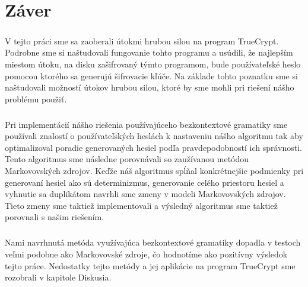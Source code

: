 \chapter{Záver}

\paragraph{}
V tejto práci sme sa zaoberali útokmi hrubou silou na program TrueCrypt. Podrobne sme si naštudovali fungovanie tohto programu a usúdili, že najlepším miestom útoku, na disku zašifrovaný týmto programom, bude používateľské heslo pomocou ktorého sa generujú šifrovacie kľúče. Na základe tohto poznatku sme si naštudovali možností útokov hrubou silou, ktoré by sme mohli pri riešení nášho problému použiť.

\paragraph{}
Pri implementácií nášho riešenia používajúceho bezkontextové gramatiky sme používali znalostí o používateľských heslách k nastaveniu nášho algoritmu tak aby optimalizoval poradie generovaných hesiel podľa pravdepodobností ich správnosti. Tento algoritmus sme následne porovnávali so zaužívanou metódou Markovovských zdrojov. Keďže náš algoritmus spĺňal konkrétnejšie podmienky pri generovaní hesiel ako sú determinizmus, generovanie celého priestoru hesiel a vyhnutie sa duplikátom navrhli sme zmeny v modeli Markovovských zdrojov. Tieto zmeny sme taktiež implementovali a výsledný algoritmus sme taktiež porovnali s našim riešením.

\paragraph{}
Nami navrhnutá metóda využívajúca bezkontextové gramatiky dopadla v testoch veľmi podobne ako Markovovské zdroje, čo hodnotíme ako pozitívny výsledok tejto práce. Nedostatky tejto metódy a jej aplikácie na program TrueCrypt sme rozobrali v kapitole Diskusia.